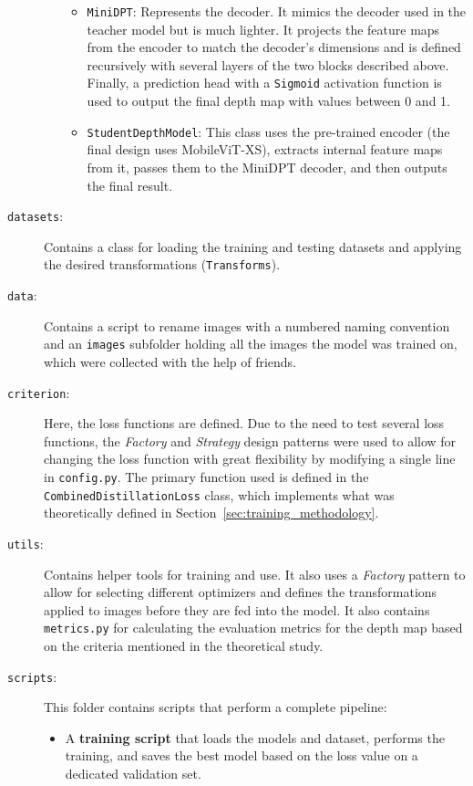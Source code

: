\begin{description}
\begin{itemize}
\begin{itemize}
            \item \texttt{MiniDPT}: Represents the decoder. It mimics the decoder used in the teacher model but is much lighter. It projects the feature maps from the encoder to match the decoder's dimensions and is defined recursively with several layers of the two blocks described above. Finally, a prediction head with a \texttt{Sigmoid} activation function is used to output the final depth map with values between 0 and 1.
            \item \texttt{StudentDepthModel}: This class uses the pre-trained encoder (the final design uses MobileViT-XS), extracts internal feature maps from it, passes them to the MiniDPT decoder, and then outputs the final result.
        \end{itemize}
    \end{itemize}
    \item[\texttt{datasets}:] Contains a class for loading the training and testing datasets and applying the desired transformations (\texttt{Transforms}).
    \item[\texttt{data}:] Contains a script to rename images with a numbered naming convention and an \texttt{images} subfolder holding all the images the model was trained on, which were collected with the help of friends.
    \item[\texttt{criterion}:] Here, the loss functions are defined. Due to the need to test several loss functions, the \textit{Factory} and \textit{Strategy} design patterns were used to allow for changing the loss function with great flexibility by modifying a single line in \texttt{config.py}. The primary function used is defined in the \texttt{CombinedDistillationLoss} class, which implements what was theoretically defined in Section~\ref{sec:training_methodology}.
    \item[\texttt{utils}:] Contains helper tools for training and use. It also uses a \textit{Factory} pattern to allow for selecting different optimizers and defines the transformations applied to images before they are fed into the model. It also contains \texttt{metrics.py} for calculating the evaluation metrics for the depth map based on the criteria mentioned in the theoretical study.
    \item[\texttt{scripts}:] This folder contains scripts that perform a complete pipeline:
    \begin{itemize}
        \item A \textbf{training script} that loads the models and dataset, performs the training, and saves the best model based on the loss value on a dedicated validation set.

\end{itemize}
\end{description}
